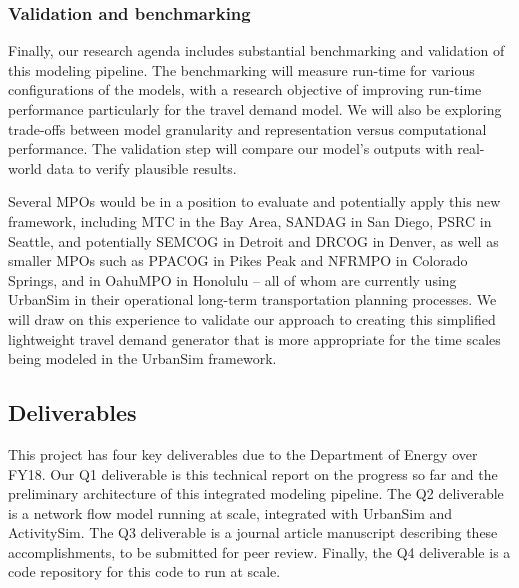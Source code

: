 \subsubsection{Validation and benchmarking}

Finally, our research agenda includes substantial benchmarking and validation of this modeling pipeline. The benchmarking will measure run-time for various configurations of the models, with a research objective of improving run-time performance particularly for the travel demand model. We will also be exploring trade-offs between model granularity and representation versus computational performance. The validation step will compare our model's outputs with real-world data to verify plausible results.

Several MPOs would be in a position to evaluate and potentially apply this new framework, including MTC in the Bay Area, SANDAG in San Diego, PSRC in Seattle, and potentially SEMCOG in Detroit and DRCOG in Denver, as well as smaller MPOs such as PPACOG in Pikes Peak and NFRMPO in Colorado Springs, and in OahuMPO in Honolulu -- all of whom are currently using UrbanSim in their operational long-term transportation planning processes. We will draw on this experience to validate our approach to creating this simplified lightweight travel demand generator that is more appropriate for the time scales being modeled in the UrbanSim framework. 

\subsection{Deliverables}
This project has four key deliverables due to the Department of Energy over FY18. Our Q1 deliverable is this technical report on the progress so far and the preliminary architecture of this integrated modeling pipeline. The Q2 deliverable is a network flow model running at scale, integrated with UrbanSim and ActivitySim. The Q3 deliverable is a journal article manuscript describing these accomplishments, to be submitted for peer review. Finally, the Q4 deliverable is a code repository for this code to run at scale.
